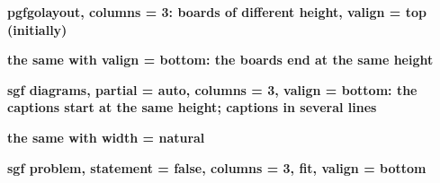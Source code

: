 \documentclass{article}
\newcommand\case[1]{\par\medskip\noindent\textbf{#1}\par\nopagebreak}
\begin{document}

\case{pgfgolayout, columns = 3: boards of different height, valign = top (initially)}
\begin{pgfgolayout}[columns = 3]
	\begin{goban}[5, scale = 0.5]\end{goban}
	\begin{goban}[5x3, scale = 0.5]\end{goban}
	\begin{goban}[9, scale = 0.5]\end{goban}
\end{pgfgolayout}

\case{the same with valign = bottom: the boards end at the same height}
\begin{pgfgolayout}[columns = 3, valign = bottom]
	\begin{goban}[5, scale = 0.5]\end{goban}
	\begin{goban}[5x3, scale = 0.5]\end{goban}
	\begin{goban}[9, scale = 0.5]\end{goban}
\end{pgfgolayout}

\case{sgf diagrams, partial = auto, columns = 3, valign = bottom: the captions start at the same height; captions in several lines}

\case{the same with width = natural}

\case{sgf problem, statement = false, columns = 3, fit, valign = bottom}
\end{document}
